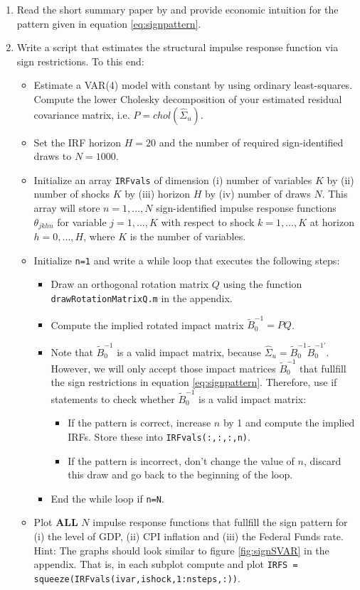 \documentclass{article}
\begin{document}
\begin{enumerate}
\item Read the short summary paper by \textcite{Wolf_2022_WhatCanWe} and provide economic intuition for the pattern given in equation \eqref{eq:signpattern}.
\item Write a script that estimates the structural impulse response function via sign restrictions.
To this end:
	\begin{itemize}
	\item Estimate a VAR{(4)} model with constant by using ordinary least-squares.
	Compute the lower Cholesky decomposition of your estimated residual covariance matrix, i.e. $P=chol(\hat{\Sigma}_u)$.
	\item Set the IRF horizon $H=20$ and the number of required sign-identified draws to $N=1000$.
	\item Initialize an array \texttt{IRFvals} of dimension
	(i) number of variables $K$ by (ii) number of shocks $K$ by (iii) horizon $H$ by (iv) number of draws $N$.
	This array will store $n=1,...,N$ sign-identified impulse response functions $\theta_{jkhn}$ for variable $j=1,...,K$
	with respect to shock $k=1,...,K$ at horizon $h=0,...,H$, where $K$ is the number of variables.
	
	\item Initialize \texttt{n=1} and write a while loop that executes the following steps:
		\begin{itemize}
		\item Draw an orthogonal rotation matrix $Q$ using the function \texttt{drawRotationMatrixQ.m} in the appendix.
		\item Compute the implied rotated impact matrix $\widetilde{B}_0^{-1}=PQ$.
		\item Note that $\widetilde{B}_0^{-1}$ is a valid impact matrix, because $\hat{\Sigma}_u = \widetilde{B}_0^{-1} \widetilde{B}_0^{-1'}$.
		However, we will only accept those impact matrices $\widetilde{B}_0^{-1}$ that fullfill the sign restrictions in equation \eqref{eq:signpattern}.
		Therefore, use if statements to check whether $\widetilde{B}_0^{-1}$ is a valid impact matrix:
		\begin{itemize}
			\item If the pattern is correct, increase $n$ by 1 and compute the implied IRFs. Store these into \texttt{IRFvals(:,:,:,n)}.
			\item If the pattern is incorrect, don't change the value of $n$, discard this draw and go back to the beginning of the loop.
			\end{itemize}
		\item End the while loop if \texttt{n=N}.
		\end{itemize}
	\item Plot \textbf{ALL} $N$ impulse response functions that fullfill the sign pattern for (i) the level of GDP, (ii) CPI inflation and (iii) the Federal Funds rate.
	\\Hint: The graphs should look similar to figure \ref{fig:signSVAR} in the appendix.
	That is, in each subplot compute and plot \texttt{IRFS = squeeze(IRFvals(ivar,ishock,1:nsteps,:))}.	
	\end{itemize}
\end{enumerate}
\end{document}
